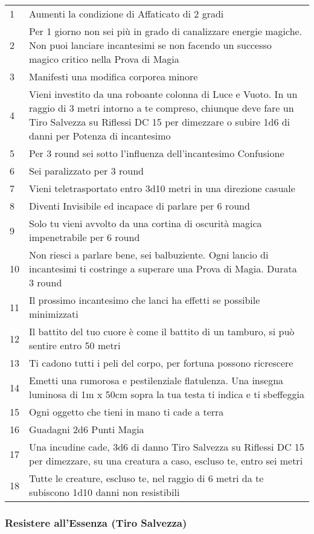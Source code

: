 \documentclass[a4paper,twoside,openany]{book}
\begin{document}
\begin{multicols}{2}
\medskip
{\small
	\begin{tabularx}{0.45\textwidth}{lX}
		\hline
1 & Aumenti la condizione di Affaticato di 2 gradi\\
2 & Per 1 giorno non sei più in grado di canalizzare energie magiche. Non puoi lanciare incantesimi se non facendo un successo magico critico nella Prova di Magia\\
3 & Manifesti una modifica corporea minore\\
4 & Vieni investito da una roboante colonna di Luce e Vuoto. In un raggio di 3 metri intorno a te compreso, chiunque deve fare un Tiro Salvezza su Riflessi DC 15 per dimezzare o subire 1d6 di danni per Potenza di incantesimo\\
5 & Per 3 round sei sotto l'influenza dell'incantesimo Confusione\\
6 & Sei paralizzato per 3 round\\
7 & Vieni teletrasportato entro 3d10 metri in una direzione casuale\\
8 & Diventi Invisibile ed incapace di parlare per 6 round\\
9 &  Solo tu vieni avvolto da una cortina di oscurità magica impenetrabile per 6 round\\
10 & Non riesci a parlare bene, sei balbuziente. Ogni lancio di incantesimi ti costringe a superare una Prova di Magia. Durata 3 round\\
11 & Il prossimo incantesimo che lanci ha effetti se possibile minimizzati\\
12 & Il battito del tuo cuore è come il battito di un tamburo, si può sentire entro 50 metri\\
13 & Ti cadono tutti i peli del corpo, per fortuna possono ricrescere\\
14 & Emetti una rumorosa e pestilenziale flatulenza. Una insegna luminosa di 1m x 50cm sopra la tua testa ti indica e ti sbeffeggia\\
15 & Ogni oggetto che tieni in mano ti cade a terra\\
16 & Guadagni 2d6 Punti Magia\\
17 & Una incudine cade, 3d6 di danno Tiro Salvezza su Riflessi DC 15 per dimezzare, su una creatura a caso, escluso te, entro sei metri\\
18 & Tutte le creature, escluso te, nel raggio di 6 metri da te subiscono 1d10 danni non resistibili\\
\end{tabularx}}


\subsubsection{Resistere all'Essenza (Tiro Salvezza)}


\end{multicols}
\end{document}
